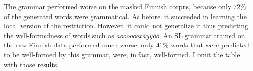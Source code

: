\begin{table}[h!]
\centering
{}
\caption{SL learning of a single harmony without blockers; abstract representation.}
\end{table}

The grammar performed worse on the masked Finnish corpus, because only $72$\% of the generated words were grammatical.
As before, it succeeded in learning the local version of the restriction.
However, it could not generalize it thus predicting the well-formedness of words such as \emph{aoooooox\"ayy\"o\"o}.
An SL grammar trained on the raw Finnish data performed much worse: only $41$\% words that were predicted to be well-formed by this grammar, were, in fact, well-formed.
I omit the table with those results.

